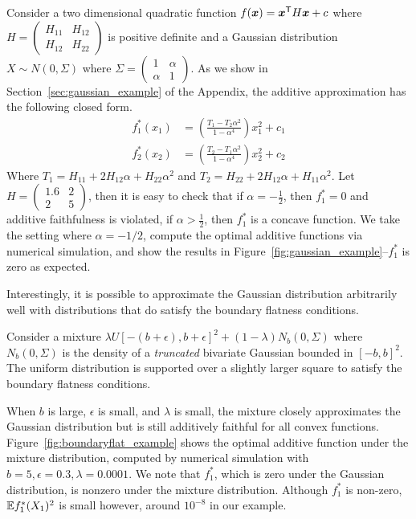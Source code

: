 \begin{example}
\label{examp:gaussian_counterexample}
Consider a two dimensional quadratic function $f( \mbox{\boldmath $x$}) = \mbox{\boldmath $x$}^{\mathsf{T}} H \mbox{\boldmath $x$} + c$ where $H = \begin{pmatrix} H_{11} & H_{12} \\ H_{12} & H_{22}\end{pmatrix}$ is positive definite and a Gaussian distribution $X \sim N(0, \Sigma)$ where $\Sigma = \begin{pmatrix}1 & \alpha \\ \alpha & 1 \end{pmatrix}$.
As we show in Section~\ref{sec:gaussian_example} of the Appendix, the additive approximation has the
following closed form.
\begin{align*}
f^*_1(x_1) &= \left( \frac{T_1 - T_2 \alpha^2}{1 - \alpha^4} \right) x_1^2 + c_1\\
f^*_2(x_2) &= \left( \frac{T_2 - T_1 \alpha^2}{1 - \alpha^4} \right) x_2^2 + c_2
\end{align*}
Where $T_1 = H_{11} + 2H_{12} \alpha + H_{22} \alpha^2$ and $T_2 = H_{22} + 2H_{12} \alpha + H_{11} \alpha^2$. Let $H = \begin{pmatrix} 1.6 & 2 \\ 2 & 5\end{pmatrix}$, then it is easy to check that if $\alpha = - \frac{1}{2}$, then $f^*_1 = 0$
and additive faithfulness is violated, if $\alpha > \frac{1}{2}$, then $f^*_1$ is a concave function. We take the setting where $\alpha=-1/2$, compute the optimal additive functions via numerical simulation, and show the results in Figure~\ref{fig:gaussian_example}--$f^*_1$ is zero as expected.
\end{example}

Interestingly, it is possible to approximate the Gaussian distribution arbitrarily well with distributions that do satisfy the boundary flatness conditions.

\begin{example} 
\label{examp:boundaryflat_example}
 Consider a mixture $\lambda U[-(b+\epsilon), b+\epsilon]^2 + (1-\lambda) N_b(0, \Sigma)$ where $N_b(0,\Sigma)$ is the density of a \emph{truncated} bivariate Gaussian bounded in $[-b, b]^2$. The uniform distribution is supported over a slightly larger square to satisfy the boundary flatness conditions.

When $b$ is large, $\epsilon$ is small, and $\lambda$ is small, the mixture closely approximates the Gaussian distribution but is still additively faithful for all convex functions. Figure~\ref{fig:boundaryflat_example} shows the optimal additive function under the mixture distribution, computed by numerical simulation with $b=5, \epsilon=0.3, \lambda=0.0001$. We note that $f^*_1$, which is zero under the Gaussian distribution, is nonzero under the mixture distribution. Although $f^*_1$ is non-zero, ${\mathbb E} f^*_1(X_1)^2$ is small however, around $10^{-8}$ in our example.
\end{example}


